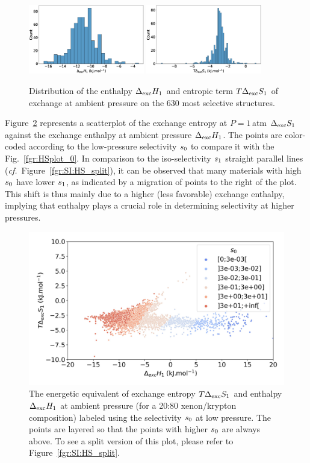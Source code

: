 \documentclass[main.tex]{subfiles}
\begin{document}
\begin{figure}[ht]
  \centering
    \includegraphics[width=0.45\textwidth]{figures/2-thermo/Delta_H_2080.jpg}
    \includegraphics[width=0.45\textwidth]{figures/2-thermo/T_Delta_S_2080.jpg}
    \caption{Distribution of the enthalpy $\Delta_{\text{exc}}H_{\text{1}}$ and entropic term $T\Delta_{\text{exc}}S_{\text{1}}$ of exchange at ambient pressure on the 630 most selective structures.}\label{fgr:SI:dist1}
\end{figure}

Figure~\ref{fgr:HSplot_1} represents a scatterplot of the exchange entropy at $P = 1$\,atm $\Delta_{\text{exc}}S_{\text{1}}$ against the exchange enthalpy at ambient pressure $\Delta_{\text{exc}}H_{\text{1}}$. The points are color-coded according to the low-pressure selectivity $s_{\text{0}}$ to compare it with the Fig.~\ref{fgr:HSplot_0}. In comparison to the iso-selectivity $s_{\text{1}}$ straight parallel lines (\emph{cf.}~Figure~\ref{fgr:SI:HS_split}), it can be observed that many materials with high $s_{\text{0}}$ have lower $s_{\text{1}}$, as indicated by a migration of points to the right of the plot. This shift is thus mainly due to a higher (less favorable) exchange enthalpy, implying that enthalpy plays a crucial role in determining selectivity at higher pressures.

\begin{figure}[ht]
  \centering
    \includegraphics[width=0.6\linewidth]{figures/2-thermo/enthalpy_entropy_2080_s_0.jpg}
    \caption{The energetic equivalent of exchange entropy $T\Delta_{\text{exc}}S_{\text{1}}$ and enthalpy $\Delta_{\text{exc}}H_{\text{1}}$ at ambient pressure (for a 20:80 xenon/krypton composition) labeled using the selectivity $s_{\text{0}}$ at low pressure. The points are layered so that the points with higher $s_{\text{0}}$ are always above. To see a split version of this plot, please refer to Figure~\ref{fgr:SI:HS_split}.}\label{fgr:HSplot_1}
  \end{figure}
 
\end{document}
